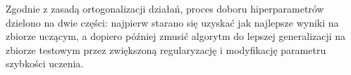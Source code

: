 Zgodnie z zasadą ortogonalizacji działań, proces doboru hiperparametrów dzielono na dwie części: najpierw starano się uzyskać jak najlepsze wyniki na zbiorze uczącym, a dopiero później zmusić algorytm do lepszej generalizacji na zbiorze testowym przez zwiększoną regularyzację i modyfikację parametru szybkości uczenia. 







%
%

